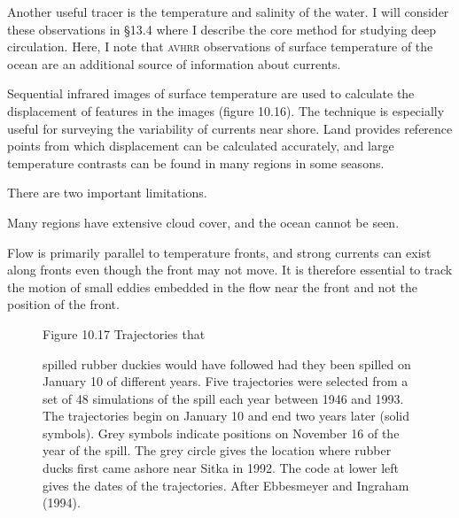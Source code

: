 Another useful tracer is the temperature and salinity of the water. I
will consider these observations in \S 13.4 where I describe the core
method for studying deep circulation. Here, I note that \textsc{avhrr}
observations
of surface temperature of the ocean are an additional source of
information about currents.

Sequential infrared images of surface temperature are used to
calculate the displacement of features in the images (figure
10.16). The technique is especially useful for surveying the
variability of currents near shore. Land provides reference points
from which displacement can be calculated accurately, and large
temperature contrasts can be found in many regions in some seasons.

There are two important limitations.
\begin{enumerate}
\vitem Many regions have extensive cloud cover, and the ocean cannot
be seen.

\vitem Flow is primarily parallel to temperature fronts, and strong
currents can exist along fronts even though the front may not move. It
is therefore essential to track the motion of small eddies embedded in
the flow near the front and not the position of the front.
\end{enumerate}

\begin{figure}[b!]
\vspace{-3ex}
\footnotesize
Figure 10.17 Trajectories that \rule{0mm}{5ex}spilled rubber duckies
would have followed had they been spilled on January 10 of different
years. Five trajectories were selected from a set of 48 simulations of
the spill each year between 1946 and 1993. The trajectories begin on
January 10 and end two years later (solid symbols). Grey symbols
indicate positions on November 16 of the year of the spill. The grey
circle gives the location where rubber ducks first came ashore near
Sitka in 1992. The code at lower left gives the dates of the
trajectories. After Ebbesmeyer and Ingraham (1994).
\label{fig:duckies}
\end{figure}

